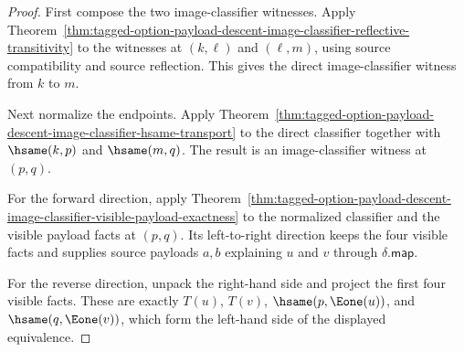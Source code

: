 \begin{proof}
First compose the two image-classifier witnesses. Apply
Theorem~\ref{thm:tagged-option-payload-descent-image-classifier-reflective-transitivity}
to the witnesses at $(k,\ell)$ and $(\ell,m)$, using source compatibility and
source reflection. This gives the direct image-classifier witness from $k$ to
$m$.

Next normalize the endpoints. Apply
Theorem~\ref{thm:tagged-option-payload-descent-image-classifier-hsame-transport}
to the direct classifier together with $\hsame(k,p)$ and $\hsame(m,q)$. The
result is an image-classifier witness at $(p,q)$.

For the forward direction, apply
Theorem~\ref{thm:tagged-option-payload-descent-image-classifier-visible-payload-exactness}
to the normalized classifier and the visible payload facts at $(p,q)$. Its
left-to-right direction keeps the four visible facts and supplies source
payloads $a,b$ explaining $u$ and $v$ through $\delta.\mathsf{map}$.

For the reverse direction, unpack the right-hand side and project the first four
visible facts. These are exactly $T(u)$, $T(v)$, $\hsame(p,\Eone(u))$, and
$\hsame(q,\Eone(v))$, which form the left-hand side of the displayed
equivalence.
\end{proof}

